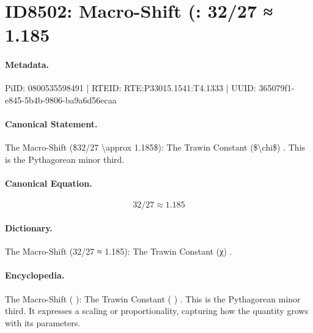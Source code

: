 \section*{ID8502: Macro-Shift (: 32/27 ≈ 1.185}
\paragraph{Metadata.}
PiID: 0800535598491 | RTEID: RTE:P33015.1541:T4.1333 | UUID: 365079f1-e845-5b4b-9806-ba9a6d56ecaa

\paragraph{Canonical Statement.}
The Macro-Shift (\$32/27 \textbackslash{}approx 1.185\$): The Trawin Constant (\$\textbackslash{}chi\$) . This is the Pythagorean minor third.

\paragraph{Canonical Equation.}
\[
32/27 \approx 1.185
\]

\paragraph{Dictionary.}
The Macro-Shift (32/27 ≈ 1.185): The Trawin Constant (χ) .

\paragraph{Encyclopedia.}
The Macro-Shift ( ): The Trawin Constant ( ) . This is the Pythagorean minor third. It expresses a scaling or proportionality, capturing how the quantity grows with its parameters.

